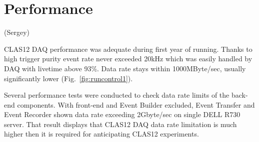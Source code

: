 \section{Performance}(Sergey)

CLAS12 DAQ performance was adequate during first year of running. Thanks to high trigger purity event rate never exceeded 20kHz which was easily handled by DAQ with livetime above 93\%. Data rate stays within 1000MByte/sec, usually significantly lower (Fig.~\ref{fig:runcontrol1}).

Several performance tests were conducted to check data rate limits of the back-end components. With front-end and Event Builder excluded, Event Transfer and Event Recorder shown data rate exceeding 2Gbyte/sec on single DELL R730 server. That result displays that CLAS12 DAQ data rate limitation is much higher then it is required for anticipating CLAS12 experiments.

